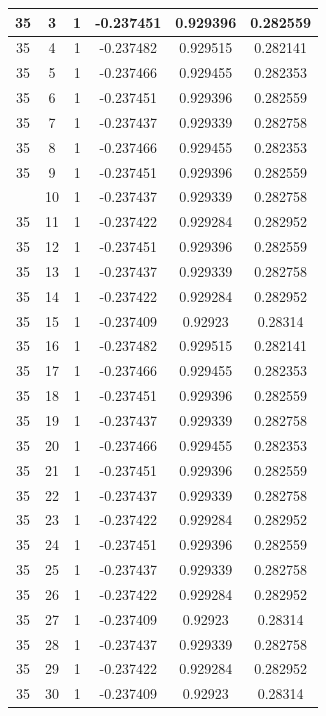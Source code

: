 \documentclass[12pt,a4paper]{article}
\numberwithin{equation}{section}
\numberwithin{figure}{section}
\numberwithin{table}{section}
\begin{document}
\begin{longtable}{|c|c|c|c|c|c|}
35 & 3 & 1 & -0.237451 & 0.929396 & 0.282559 \\ \hline
35 & 4 & 1 & -0.237482 & 0.929515 & 0.282141 \\ \hline
35 & 5 & 1 & -0.237466 & 0.929455 & 0.282353 \\ \hline
35 & 6 & 1 & -0.237451 & 0.929396 & 0.282559 \\ \hline
35 & 7 & 1 & -0.237437 & 0.929339 & 0.282758 \\ \hline
35 & 8 & 1 & -0.237466 & 0.929455 & 0.282353 \\ \hline
35 & 9 & 1 & -0.237451 & 0.929396 & 0.282559 \\ \hline
\pagebreak
35 & 10 & 1 & -0.237437 & 0.929339 & 0.282758 \\ \hline
35 & 11 & 1 & -0.237422 & 0.929284 & 0.282952 \\ \hline
35 & 12 & 1 & -0.237451 & 0.929396 & 0.282559 \\ \hline
35 & 13 & 1 & -0.237437 & 0.929339 & 0.282758 \\ \hline
35 & 14 & 1 & -0.237422 & 0.929284 & 0.282952 \\ \hline
35 & 15 & 1 & -0.237409 & 0.92923 & 0.28314 \\ \hline
35 & 16 & 1 & -0.237482 & 0.929515 & 0.282141 \\ \hline
35 & 17 & 1 & -0.237466 & 0.929455 & 0.282353 \\ \hline
35 & 18 & 1 & -0.237451 & 0.929396 & 0.282559 \\ \hline
35 & 19 & 1 & -0.237437 & 0.929339 & 0.282758 \\ \hline
35 & 20 & 1 & -0.237466 & 0.929455 & 0.282353 \\ \hline
35 & 21 & 1 & -0.237451 & 0.929396 & 0.282559 \\ \hline
35 & 22 & 1 & -0.237437 & 0.929339 & 0.282758 \\ \hline
35 & 23 & 1 & -0.237422 & 0.929284 & 0.282952 \\ \hline
35 & 24 & 1 & -0.237451 & 0.929396 & 0.282559 \\ \hline
35 & 25 & 1 & -0.237437 & 0.929339 & 0.282758 \\ \hline
35 & 26 & 1 & -0.237422 & 0.929284 & 0.282952 \\ \hline
35 & 27 & 1 & -0.237409 & 0.92923 & 0.28314 \\ \hline
35 & 28 & 1 & -0.237437 & 0.929339 & 0.282758 \\ \hline
35 & 29 & 1 & -0.237422 & 0.929284 & 0.282952 \\ \hline
35 & 30 & 1 & -0.237409 & 0.92923 & 0.28314 \\ \hline

\end{longtable}
\end{document}
